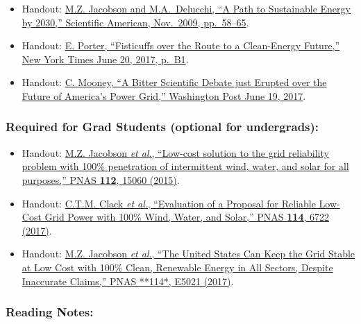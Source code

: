\documentclass[
]{article}
\providecommand{\tightlist}{%
  \setlength{\itemsep}{0pt}\setlength{\parskip}{0pt}}
\begin{document}
\begin{itemize}
\tightlist
\item
  Handout:
  \href{https://web.stanford.edu/group/efmh/jacobson/Articles/I/sad1109Jaco5p.indd.pdf}{M.Z.
  Jacobson and M.A.~Delucchi, ``A Path to Sustainable Energy by 2030,''
  Scientific American, Nov.~2009, pp.~58--65}.
\item
  Handout:
  \href{https://www.nytimes.com/2017/06/20/business/energy-environment/renewable-energy-national-academy-matt-jacobson.html}{E.
  Porter, ``Fisticuffs over the Route to a Clean-Energy Future,'' New
  York Times June 20, 2017, p.~B1}.
\item
  Handout:
  \href{https://www.washingtonpost.com/news/energy-environment/wp/2017/06/19/a-bitter-scientific-debate-just-erupted-over-the-future-of-the-u-s-electric-grid/}{C.
  Mooney, ``A Bitter Scientific Debate just Erupted over the Future of
  America's Power Grid,'' Washington Post June 19, 2017}.
\end{itemize}

\hypertarget{required-for-grad-students-optional-for-undergrads-1}{%
\subsubsection{Required for Grad Students (optional for
undergrads):}\label{required-for-grad-students-optional-for-undergrads-1}}

\begin{itemize}
\tightlist
\item
  Handout: \href{http://www.pnas.org/content/112/49/15060}{M.Z. Jacobson
  \emph{et al}., ``Low-cost solution to the grid reliability problem
  with 100\% penetration of intermittent wind, water, and solar for all
  purposes,'' PNAS \textbf{112}, 15060 (2015)}.
\item
  Handout: \href{http://www.pnas.org/content/114/26/6722}{C.T.M. Clack
  \emph{et al}., ``Evaluation of a Proposal for Reliable Low-Cost Grid
  Power with 100\% Wind, Water, and Solar,'' PNAS \textbf{114}, 6722
  (2017)}.
\item
  Handout: \href{http://www.pnas.org/content/114/26/E5021}{M.Z. Jacobson
  \emph{et al}., ``The United States Can Keep the Grid Stable at Low
  Cost with 100\% Clean, Renewable Energy in All Sectors, Despite
  Inaccurate Claims,'' PNAS **114*, E5021 (2017)}.
\end{itemize}

\hypertarget{reading-notes-25}{%
\subsubsection{Reading Notes:}\label{reading-notes-25}}
\end{document}
